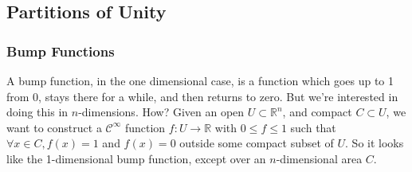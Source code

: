 \documentclass{article}
\newcommand{\reals}[0]{\mathbb{R}}
\newcommand{\mc}[1]{\mathcal{#1}}
\begin{document}
\subsection{Partitions of Unity}


\subsubsection{Bump Functions}

A bump function, in the one dimensional case, is a function which goes up to 1 from 0, stays there for a while, and then returns to zero. But we're interested in doing this in \(n\)-dimensions. How? Given an open \(U \subset \reals^n\), and compact \(C \subset U\), we want to construct a \(\mc{C}^\infty\) function \(f: U \to \reals\) with \(0 \leq f \leq 1\) such that \(\forall x \in C, f(x) = 1\) and \(f(x) = 0\) outside some compact subset of \(U\). So it looks like the 1-dimensional bump function, except over an \(n\)-dimensional area \(C\).
\end{document}
